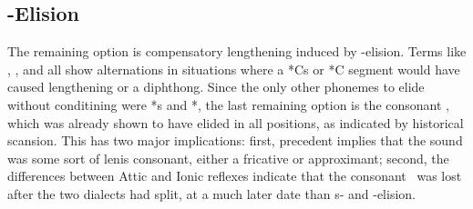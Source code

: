 
\subsection{\W-Elision}\label{subsec:WElision}
The remaining option is compensatory lengthening induced by \w-elision. Terms like ,
, and  all show alternations in situations where a *Cs or *C\textel{\yod} segment
would have caused lengthening or a diphthong. Since the only other phonemes to elide without conditining
were *s and *\textel{\yod}, the last remaining option is the consonant \w, which was already shown to have
elided in all positions, as indicated by historical scansion. This has two major implications: first,
precedent implies that the sound was some sort of lenis consonant, either a fricative or approximant;
second, the differences between Attic and Ionic reflexes indicate that the consonant \w\ was lost
after the two dialects had split, at a much later date than s- and \textel{\yod}-elision.

